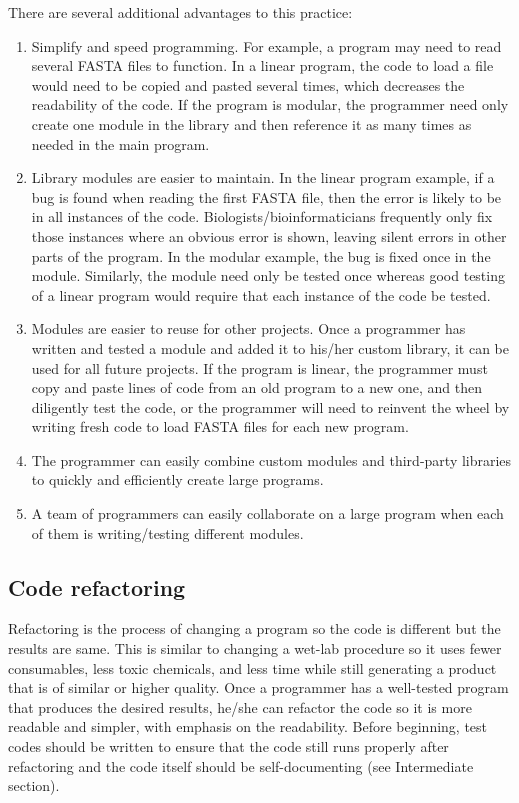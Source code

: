 \documentclass[ChapterTOCs,krantz2]{krantz} %
\begin{document}
There are several additional advantages to this practice:  
\begin{enumerate}

\item Simplify and speed programming.  For example, a program may need to read
several FASTA files to function.  In a linear program, the
code to load a file would need to be copied and pasted several times,
which decreases the readability of the code.  If the program is modular, the
programmer need only create one module in the library and then reference it as
many times as needed in the main program.  

\item Library modules are easier to maintain.  
In the linear program example, if a bug is found when
reading the first FASTA file, then the error is likely to be in all instances
of the code.  Biologists/bioinformaticians frequently only fix those
instances where an obvious error is shown, leaving silent errors in other parts
of the program.  In the modular example, the bug is fixed once in the module.  
Similarly, the module need only be
tested once whereas good testing of a linear program would require that each
instance of the code be tested.  

\item Modules are
easier to reuse for other projects.  Once a programmer has written and tested a
module and added it to his/her custom library, it
can be used for all future projects.  If the program is linear, the programmer
must copy and paste lines of code from an old program to a new one, and then
diligently test the code, or the
programmer will need to reinvent the wheel by writing fresh code to load FASTA
files for each new program.  

\item The programmer can easily combine custom
modules and third-party libraries to quickly and efficiently create large
programs.  

\item A team of programmers can easily collaborate on a large
program when each of them is writing/testing different modules.  

\end{enumerate}


\subsection{Code refactoring}

Refactoring is the process of changing a program so the code is different but
the results are same.  This is similar to changing a wet-lab procedure  
so it uses fewer consumables, less toxic chemicals, and less time while still
generating a product that is of similar or higher quality.  Once a programmer has a
well-tested program that produces the desired results, he/she can refactor the
code so it is more readable and simpler, with emphasis on the readability.
Before beginning, test codes should be written to ensure that the code still
runs properly after refactoring and the code itself should be self-documenting
(see Intermediate section). 
\end{document}
